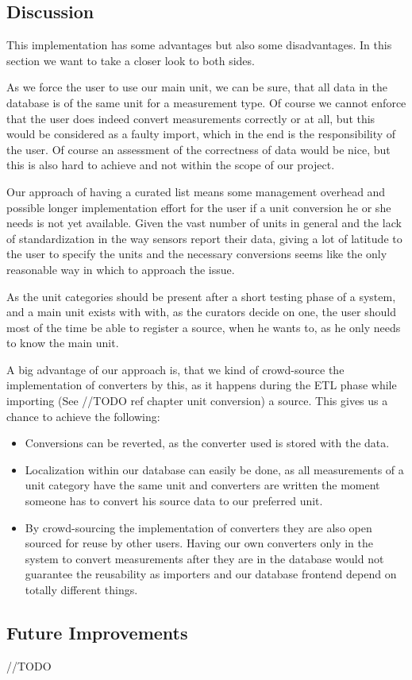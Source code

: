 \subsection{Discussion}\label{discussion}

This implementation has some advantages but also some disadvantages. In
this section we want to take a closer look to both sides.

As we force the user to use our main unit, we can be sure, that all data
in the database is of the same unit for a measurement type. Of course we
cannot enforce that the user does indeed convert measurements correctly
or at all, but this would be considered as a faulty import, which in the
end is the responsibility of the user. Of course an assessment of the
correctness of data would be nice, but this is also hard to achieve and
not within the scope of our project.

Our approach of having a curated list means some management overhead and
possible longer implementation effort for the user if a unit conversion
he or she needs is not yet available. Given the vast number of units in
general and the lack of standardization in the way sensors report their
data, giving a lot of latitude to the user to specify the units and the
necessary conversions seems like the only reasonable way in which to
approach the issue.

As the unit categories should be present after a short testing phase of
a system, and a main unit exists with with, as the curators decide on
one, the user should most of the time be able to register a source, when
he wants to, as he only needs to know the main unit.

A big advantage of our approach is, that we kind of crowd-source the
implementation of converters by this, as it happens during the ETL phase
while importing (See //TODO ref chapter unit conversion) a source. This
gives us a chance to achieve the following:

\begin{itemize}
\tightlist
\item
  Conversions can be reverted, as the converter used is stored with the
  data.
\item
  Localization within our database can easily be done, as all
  measurements of a unit category have the same unit and converters are
  written the moment someone has to convert his source data to our
  preferred unit.
\item
  By crowd-sourcing the implementation of converters they are also open
  sourced for reuse by other users. Having our own converters only in
  the system to convert measurements after they are in the database
  would not guarantee the reusability as importers and our database
  frontend depend on totally different things.
\end{itemize}

\subsection{Future Improvements}\label{future-improvements}

//TODO
